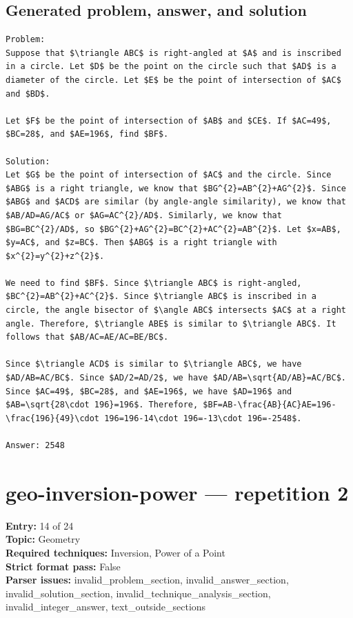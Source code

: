 \documentclass[11pt]{article}
\begin{document}
\subsection*{Generated problem, answer, and solution}
\begin{Verbatim}[breaklines=true,breakanywhere=true,fontsize=\small]
Problem:
Suppose that $\triangle ABC$ is right-angled at $A$ and is inscribed in a circle. Let $D$ be the point on the circle such that $AD$ is a diameter of the circle. Let $E$ be the point of intersection of $AC$ and $BD$.

Let $F$ be the point of intersection of $AB$ and $CE$. If $AC=49$, $BC=28$, and $AE=196$, find $BF$.

Solution:
Let $G$ be the point of intersection of $AC$ and the circle. Since $ABG$ is a right triangle, we know that $BG^{2}=AB^{2}+AG^{2}$. Since $ABG$ and $ACD$ are similar (by angle-angle similarity), we know that $AB/AD=AG/AC$ or $AG=AC^{2}/AD$. Similarly, we know that $BG=BC^{2}/AD$, so $BG^{2}+AG^{2}=BC^{2}+AC^{2}=AB^{2}$. Let $x=AB$, $y=AC$, and $z=BC$. Then $ABG$ is a right triangle with $x^{2}=y^{2}+z^{2}$.

We need to find $BF$. Since $\triangle ABC$ is right-angled, $BC^{2}=AB^{2}+AC^{2}$. Since $\triangle ABC$ is inscribed in a circle, the angle bisector of $\angle ABC$ intersects $AC$ at a right angle. Therefore, $\triangle ABE$ is similar to $\triangle ABC$. It follows that $AB/AC=AE/AC=BE/BC$.

Since $\triangle ACD$ is similar to $\triangle ABC$, we have $AD/AB=AC/BC$. Since $AD/2=AD/2$, we have $AD/AB=\sqrt{AD/AB}=AC/BC$. Since $AC=49$, $BC=28$, and $AE=196$, we have $AD=196$ and $AB=\sqrt{28\cdot 196}=196$. Therefore, $BF=AB-\frac{AB}{AC}AE=196-\frac{196}{49}\cdot 196=196-14\cdot 196=-13\cdot 196=-2548$.

Answer: 2548
\end{Verbatim}
\clearpage
\section{geo-inversion-power --- repetition 2}
{\color{metadata}
\textbf{Entry:} 14 of 24\\
\textbf{Topic:} Geometry\\
\textbf{Required techniques:} Inversion, Power of a Point\\
\textbf{Strict format pass:} False\\
\textbf{Parser issues:} invalid\_problem\_section, invalid\_answer\_section, invalid\_solution\_section, invalid\_technique\_analysis\_section, invalid\_integer\_answer, text\_outside\_sections
}
\end{document}
